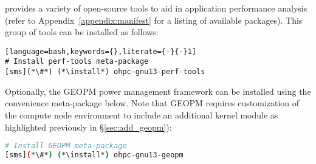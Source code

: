 \OHPC{} provides a variety of open-source tools to aid in application
performance analysis (refer to Appendix~\ref{appendix:manifest} for a listing
of available packages). This group of tools can be installed as follows:

\begin{lstlisting}[language=bash,keywords={},literate={-}{-}1]
# Install perf-tools meta-package
[sms](*\#*) (*\install*) ohpc-gnu13-perf-tools
\end{lstlisting}

\noindent Optionally, the GEOPM power management framework can be installed
using the convenience meta-package below. Note that GEOPM
requires customization of the compute node environment to include an additional
kernel module as highlighted previously in \S\ref{sec:add_geopm}):

\begin{lstlisting}[language=bash,keywords={},upquote=true]
# Install GEOPM meta-package
[sms](*\#*) (*\install*) ohpc-gnu13-geopm

\end{lstlisting}
